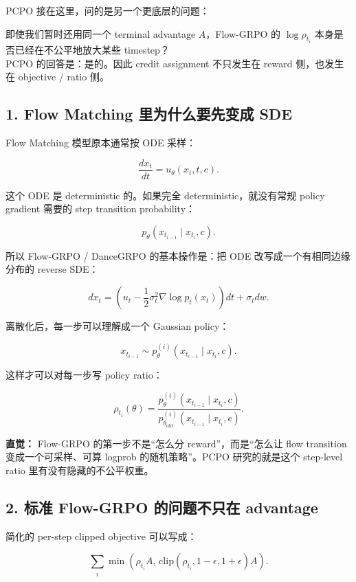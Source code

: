 PCPO 接在这里，问的是另一个更底层的问题：

\begin{summarybox}
即使我们暂时还用同一个 terminal advantage \(A\)，Flow-GRPO 的 \(\log \rho_{t_i}\) 本身是否已经在不公平地放大某些 timestep？\\
PCPO 的回答是：是的。因此 credit assignment 不只发生在 reward 侧，也发生在 objective / ratio 侧。
\end{summarybox}

\subsection{1. Flow Matching 里为什么要先变成 SDE}

Flow Matching 模型原本通常按 ODE 采样：

\[
\frac{d x_t}{dt}=u_\theta(x_t,t,c).
\]

这个 ODE 是 deterministic 的。如果完全 deterministic，就没有常规 policy gradient 需要的 step transition probability：

\[
p_\theta(x_{t_{i-1}}\mid x_{t_i},c).
\]

所以 Flow-GRPO / DanceGRPO 的基本操作是：把 ODE 改写成一个有相同边缘分布的 reverse SDE：

\[
d x_t
=
\left(
u_t
-
\frac{1}{2}\sigma_t^2
\nabla \log p_t(x_t)
\right)dt
+
\sigma_t d w .
\]

离散化后，每一步可以理解成一个 Gaussian policy：

\[
x_{t_{i-1}}
\sim
p_\theta^{(i)}
\left(
x_{t_{i-1}}\mid x_{t_i},c
\right).
\]

这样才可以对每一步写 policy ratio：

\[
\rho_{t_i}(\theta)
=
\frac{
p_\theta^{(i)}(x_{t_{i-1}}\mid x_{t_i},c)
}{
p_{\theta_{\mathrm{old}}}^{(i)}(x_{t_{i-1}}\mid x_{t_i},c)
}.
\]

\begin{intubox}
\textbf{直觉：} Flow-GRPO 的第一步不是“怎么分 reward”，而是“怎么让 flow transition 变成一个可采样、可算 logprob 的随机策略”。PCPO 研究的就是这个 step-level ratio 里有没有隐藏的不公平权重。
\end{intubox}

\subsection{2. 标准 Flow-GRPO 的问题不只在 advantage}

简化的 per-step clipped objective 可以写成：

\[
\sum_i
\min
\left(
\rho_{t_i} A,\,
\mathrm{clip}(\rho_{t_i},1-\epsilon,1+\epsilon) A
\right).
\]

